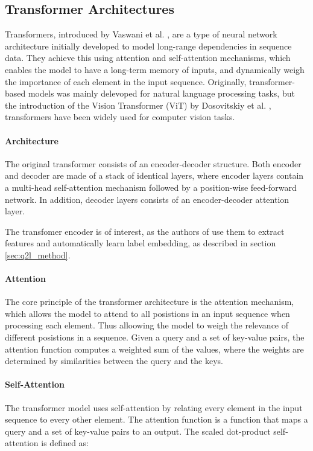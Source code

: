 \documentclass[lettersize,journal]{IEEEtran}
\begin{document}
\subsection{Transformer Architectures}
Transformers, introduced by Vaswani et al. \cite{vaswani2023attentionneed}, are a type of neural network architecture initially developed to model long-range dependencies in sequence data. They achieve this using attention and self-attention mechanisms, which enables the model to have a long-term memory of inputs, and dynamically weigh the importance of each element in the input sequence. Originally, transformer-based models was mainly delevoped for natural language processing tasks, but the introduction of the Vision Transformer (ViT) by Dosovitskiy et al. \cite{dosovitskiy2021imageworth16x16words}, transformers have been widely used for computer vision tasks. 

\paragraph{Architecture}
The original transformer consists of an encoder-decoder structure. Both encoder and decoder are made of a stack of identical layers, where encoder layers contain a multi-head self-attention mechanism followed by a position-wise feed-forward network. In addition, decoder layers consists of an encoder-decoder attention layer. 

The transfomer encoder is of interest, as the authors of \cite{Query2Label} use them to extract features and automatically learn label embedding, as described in section \ref{sec:q2l_method}.

\paragraph{Attention}
The core principle of the transformer architecture is the attention mechanism, which allows the model to attend to all posistions in an input sequence when processing each element. Thus alloowing the model to weigh the relevance of different posistions in a sequence. Given a query and a set of key-value pairs, the attention function computes a weighted sum of the values, where the weights are determined by similarities between the query and the keys.

\paragraph{Self-Attention}
The transformer model uses self-attention by relating every element in the input sequence to every other element. The attention function is a function that maps a query and a set of key-value pairs to an output. The scaled dot-product self-attention is defined as:
\end{document}
